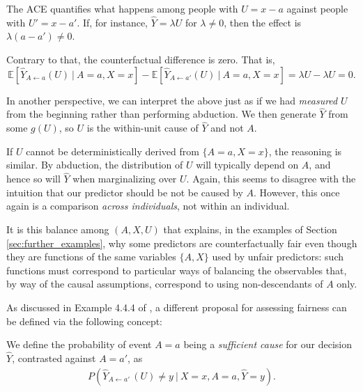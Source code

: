 The ACE quantifies what happens among people with $U = x -
a$ against people with $U' = x - a'$. If, for instance, $\hat Y =
\lambda U$ for $\lambda \neq 0$, then the effect is $\lambda(a - a')
\neq 0$.

Contrary to that, the counterfactual difference is zero. That is,
\[
\mathbb{E}[\hat Y_{A \leftarrow a}(U)\ |\ A = a, X = x] -
\mathbb{E}[\hat Y_{A \leftarrow a'}(U)\ |\ A = a, X = x] =
\lambda U - \lambda U = 0.
\]

In another perspective, we can interpret the above just as if we had
{\it measured} $U$ from the beginning rather than performing
abduction. We then generate $\hat Y$ from some $g(U)$, so $U$ is the
within-unit cause of $\hat Y$ and not $A$.

If $U$ cannot be deterministically derived from $\{A = a, X = x\}$,
the reasoning is similar. By abduction, the distribution of $U$ will
typically depend on $A$, and hence so will $\hat Y$ when marginalizing
over $U$. Again, this seems to disagree with the intuition that our
predictor should be not be caused by $A$. However, this once again is
a comparison {\it across individuals}, not within an individual. 

It is this balance among $(A, X, U)$ that explains, in the examples
of Section \ref{sec:further_examples}, why some predictors are
counterfactually fair even though they are functions of the same
variables $\{A, X\}$ used by unfair predictors: such functions must
correspond to particular ways of balancing the observables that, by
way of the causal assumptions, correspond to using non-descendants of
$A$ only.

 As discussed in
Example 4.4.4 of \citet{pearl:16}, a different proposal for
assessing fairness can be defined via the following concept:
\begin{define}
  We define the probability of event $A = a$ being a \emph{sufficient cause} for our
  decision $\hat Y$, contrasted against $A = a'$, as
\begin{align}
  P(\hat Y_{A \leftarrow a'\ }(U) \neq y\ |\ X = x, A = a, \hat Y = y).
\end{align}
\end{define}

